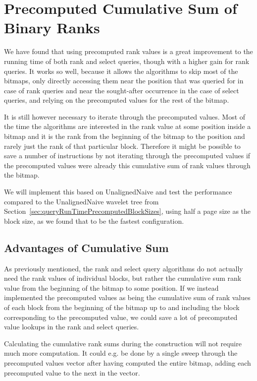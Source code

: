 \section{Precomputed Cumulative Sum of Binary Ranks}
We have found that using precomputed rank values is a great improvement to the running time of both rank and select queries, though with a higher gain for rank queries.
It works so well, because it allows the algorithms to skip most of the bitmaps, only directly accessing them near the position that was queried for in case of rank queries and near the sought-after occurrence in the case of select queries, and relying on the precomputed values for the rest of the bitmap.

It is still however necessary to iterate through the precomputed values.
Most of the time the algorithms are interested in the rank value at some position inside a bitmap and it is the rank from the beginning of the bitmap to the position and rarely just the rank of that particular block.
Therefore it might be possible to save a number of instructions by not iterating through the precomputed values if the precomputed values were already this cumulative sum of rank values through the bitmap.

We will implement this based on UnalignedNaive and test the performance compared to the UnalignedNaive wavelet tree from Section~\ref{sec:queryRunTimePrecomputedBlockSizes}, using half a page size as the block size, as we found that to be the fastest configuration.

\subsection{Advantages of Cumulative Sum}
As previously mentioned, the rank and select query algorithms do not actually need the rank values of individual blocks, but rather the cumulative sum rank value from the beginning of the bitmap to some position.
If we instead implemented the precomputed values as being the cumulative sum of rank values of each block from the beginning of the bitmap up to and including the block corresponding to the precomputed value, we could save a lot of precomputed value lookups in the rank and select queries.

Calculating the cumulative rank sums during the construction will not require much more computation.
It could e.g. be done by a single sweep through the precomputed values vector after having computed the entire bitmap, adding each precomputed value to the next in the vector.

